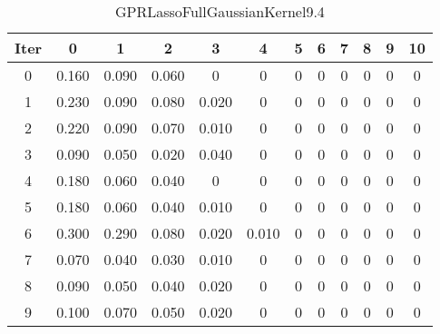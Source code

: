 \begin{table}
	\begin{center}
		\begin{tabular}{|c|c|c|c|c|c|c|c|c|c|c|c|}
			\hline
			Iter & 0 & 1 & 2 & 3 & 4 & 5 & 6 & 7 & 8 & 9 & 10 \\
			\hline
			0 & 0.160 & 0.090 & 0.060 & 0 & 0 & 0 & 0 & 0 & 0 & 0 & 0 \\
			\hline
			1 & 0.230 & 0.090 & 0.080 & 0.020 & 0 & 0 & 0 & 0 & 0 & 0 & 0 \\
			\hline
			2 & 0.220 & 0.090 & 0.070 & 0.010 & 0 & 0 & 0 & 0 & 0 & 0 & 0 \\
			\hline
			3 & 0.090 & 0.050 & 0.020 & 0.040 & 0 & 0 & 0 & 0 & 0 & 0 & 0 \\
			\hline
			4 & 0.180 & 0.060 & 0.040 & 0 & 0 & 0 & 0 & 0 & 0 & 0 & 0 \\
			\hline
			5 & 0.180 & 0.060 & 0.040 & 0.010 & 0 & 0 & 0 & 0 & 0 & 0 & 0 \\
			\hline
			6 & 0.300 & 0.290 & 0.080 & 0.020 & 0.010 & 0 & 0 & 0 & 0 & 0 & 0 \\
			\hline
			7 & 0.070 & 0.040 & 0.030 & 0.010 & 0 & 0 & 0 & 0 & 0 & 0 & 0 \\
			\hline
			8 & 0.090 & 0.050 & 0.040 & 0.020 & 0 & 0 & 0 & 0 & 0 & 0 & 0 \\
			\hline
			9 & 0.100 & 0.070 & 0.050 & 0.020 & 0 & 0 & 0 & 0 & 0 & 0 & 0 \\
			\hline
		\end{tabular}
	\end{center}
	\caption{GPRLassoFullGaussianKernel9.4}
\end{table}